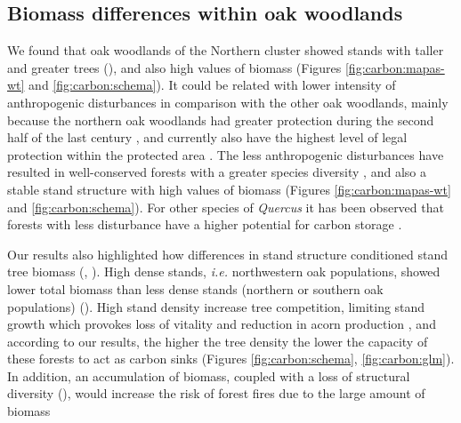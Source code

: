 \subsection{Biomass differences within oak woodlands}\label{sec:carbon:discussion-differences}
We found that oak woodlands of the Northern cluster showed stands with taller and greater trees (), and also high values of biomass (Figures \ref{fig:carbon:mapas-wt} and \ref{fig:carbon:schema}). It could be related with lower intensity of anthropogenic disturbances in comparison with the other oak woodlands, mainly because the northern oak woodlands had greater protection during the second half of the last century \autocite{JimenezOlivencia1991PaisajesSierra}, and currently also have the highest level of legal protection within the protected area \autocite{Anonymous2011Decreto238}. The less anthropogenic disturbances have resulted in well-conserved forests with a greater species diversity \autocite{PerezLuqueetal2021EcologicalDiversity}, and also a stable stand structure with high values of biomass (Figures \ref{fig:carbon:mapas-wt} and \ref{fig:carbon:schema}). For other species of \emph{Quercus} it has been observed that forests with less disturbance have a higher potential for carbon storage \autocite{BalboaMuriasetal2006CarbonNutrient,Cotillasetal2016AbovegroundBelowground,Stojanovicetal2017ForecastingTree}.

Our results also highlighted how differences in stand structure conditioned stand tree biomass (, ). High dense stands, \emph{i.e.} northwestern oak populations, showed lower total biomass than less dense stands (northern or southern oak populations) (). High stand density increase tree competition, limiting stand growth which provokes loss of vitality and reduction in acorn production \autocite{Bravoetal2008SelviculturaMontes,Piqueetal2018Spain}, and according to our results, the higher the tree density the lower the capacity of these forests to act as carbon sinks (Figures \ref{fig:carbon:schema}, \ref{fig:carbon:glm}). In addition, an accumulation of biomass, coupled with a loss of structural diversity (), would increase the risk of forest fires due to the large amount of biomass \autocite{Canellasetal2004GrowthResponse,PiqueVericat2015EvolutionPerspectives,Serradaetal1992CoppiceSystem}


